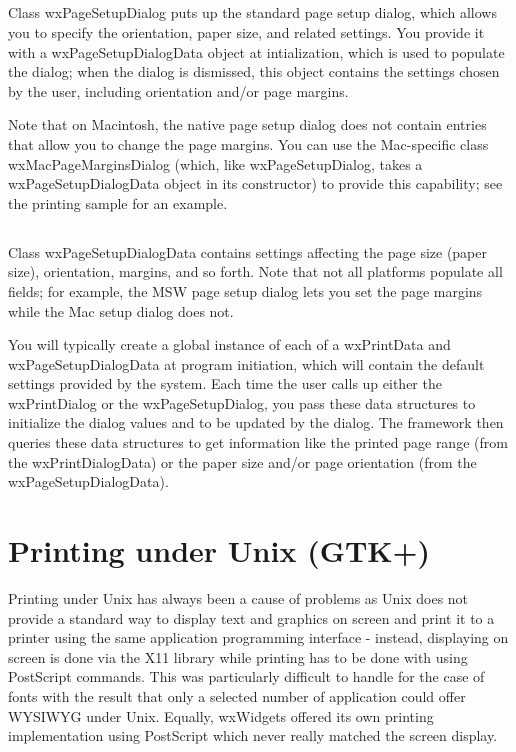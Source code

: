 \subsection{}

Class wxPageSetupDialog puts up the standard page setup dialog, which allows you
to specify the orientation, paper size, and related settings. You provide it
with a wxPageSetupDialogData object at intialization, which is used to populate
the dialog; when the dialog is dismissed, this object contains the settings
chosen by the user, including orientation and/or page margins.

Note that on Macintosh, the native page setup dialog does not contain entries
that allow you to change the page margins. You can use the Mac-specific class
wxMacPageMarginsDialog (which, like wxPageSetupDialog, takes a
wxPageSetupDialogData object in its constructor) to provide this capability; see
the printing sample for an example.

\subsection{}

Class wxPageSetupDialogData contains settings affecting the page size (paper
size), orientation, margins, and so forth. Note that not all platforms populate
all fields; for example, the MSW page setup dialog lets you set the page margins
while the Mac setup dialog does not.

You will typically create a global instance of each of a wxPrintData and
wxPageSetupDialogData at program initiation, which will contain the default
settings provided by the system. Each time the user calls up either the
wxPrintDialog or the wxPageSetupDialog, you pass these data structures to
initialize the dialog values and to be updated by the dialog. The framework then
queries these data structures to get information like the printed page range
(from the wxPrintDialogData) or the paper size and/or page orientation (from the
wxPageSetupDialogData).


\section{Printing under Unix (GTK+)}\label{unixprinting}

Printing under Unix has always been a cause of problems as Unix
does not provide a standard way to display text and graphics
on screen and print it to a printer using the same application
programming interface - instead, displaying on screen is done
via the X11 library while printing has to be done with using
PostScript commands. This was particularly difficult to handle
for the case of fonts with the result that only a selected
number of application could offer WYSIWYG under Unix. Equally,
wxWidgets offered its own printing implementation using PostScript
which never really matched the screen display.

